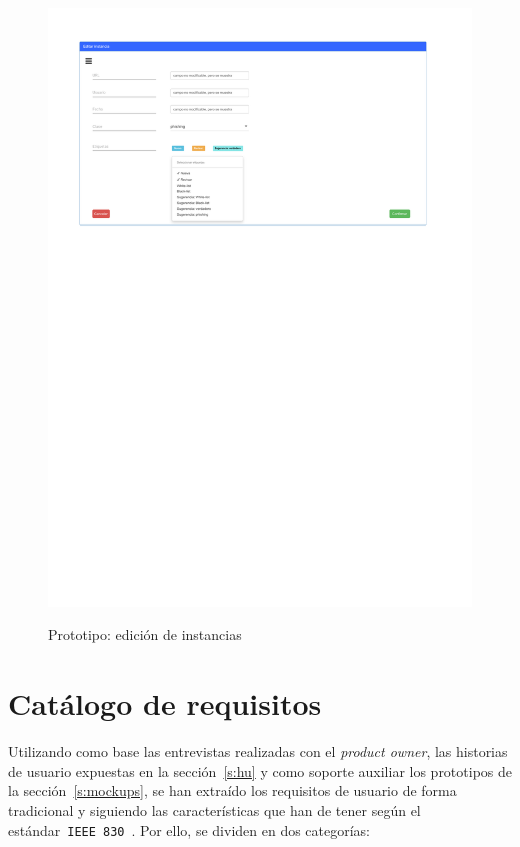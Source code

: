 \begin{figure}[h]
	\caption{Prototipo: edición de instancias}
	\centering
	\includegraphics[width=\textwidth]{../img/anexos/mockups/10-mockups-edit_instance}
	\label{mock:instances-edit}
\end{figure}

\section{Catálogo de requisitos}
\label{s:cat-requisitos}

Utilizando como base las entrevistas realizadas con el \textit{product owner}, las historias de usuario expuestas en la sección~\ref{s:hu} y como soporte auxiliar los prototipos de la sección~\ref{s:mockups}, se han extraído los requisitos de usuario de forma tradicional y siguiendo las características que han de tener según el estándar~\texttt{IEEE 830}~\cite{ieee830}. Por ello, se dividen en dos categorías:

